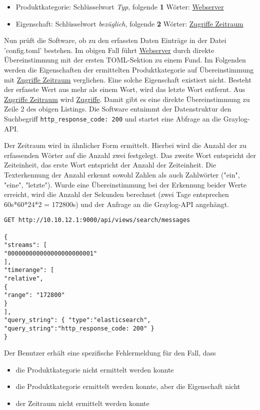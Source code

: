 \begin{itemize}
\item Produktkategorie: Schlüsselwort \textit{Typ}, folgende \textbf{1} Wörter: \underline{Webserver}
\item Eigenschaft: Schlüsselwort \textit{bezüglich}, folgende \textbf{2} Wörter: \underline{Zugriffe Zeitraum}
\end{itemize}

Nun prüft die Software, ob zu den erfassten Daten Einträge in der Datei 'config.toml' bestehen. Im obigen Fall führt \underline{Webserver} durch direkte Übereinstimmung mit der ersten TOML-Sektion zu einem Fund. Im Folgenden werden die Eigenschaften der ermittelten Produktkategorie auf Übereinstimmung mit \underline{Zugriffe Zeitraum} verglichen. Eine solche Eigenschaft existiert nicht. Besteht der erfasste Wert aus mehr als einem Wort, wird das letzte Wort entfernt. Aus \underline{Zugriffe Zeitraum} wird \underline{Zugriffe}. Damit gibt es eine direkte Übereinstimmung zu Zeile 2 des obigen Listings. Die Software entnimmt der Datenstruktur den Suchbegriff \lstinline{http_response_code: 200} und startet eine Abfrage an die Graylog-API.

Der Zeitraum wird in ähnlicher Form ermittelt. Hierbei wird die Anzahl der zu erfassenden Wörter auf die Anzahl zwei festgelegt. Das zweite Wort entspricht der Zeiteinheit, das erste Wort entspricht der Anzahl der Zeiteinheit. Die Texterkennung der Anzahl erkennt sowohl Zahlen als auch Zahlwörter ("ein", "eine", "letzte"). Wurde eine Übereinstimmung bei der Erkennung beider Werte erreicht, wird die Anzahl der Sekunden berechnet (zwei Tage entsprechen 60s*60*24*2 = 172800s) und der Anfrage an die Graylog-API angehängt.

\begin{lstlisting}[caption={Anfrage der Software an Graylog mit den ermittelten Daten}, label=graylog-query, xleftmargin=6mm]
GET http://10.10.12.1:9000/api/views/search/messages

{
"streams": [
"000000000000000000000001"
],
"timerange": [
"relative",
{
"range": "172800"
}
],
"query_string": { "type":"elasticsearch", "query_string":"http_response_code: 200" }
}
\end{lstlisting}

Der Benutzer erhält eine spezifische Fehlermeldung für den Fall, dass

\begin{itemize}
\item die Produktkategorie nicht ermittelt werden konnte
\item die Produktkategorie ermittelt werden konnte, aber die Eigenschaft nicht
\item der Zeitraum nicht ermittelt werden konnte
\end{itemize}

